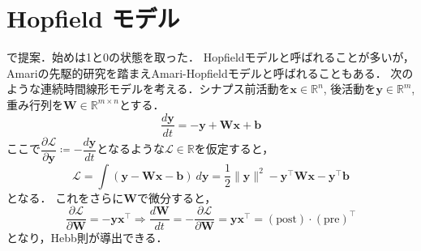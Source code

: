 \section{Hopfield モデル}
\citep{Hopfield1982-vu}で提案．始めは1と0の状態を取った．
Hopfieldモデルと呼ばれることが多いが，Amariの先駆的研究\citep{Amari1972-fq}を踏まえAmari-Hopfieldモデルと呼ばれることもある．
次のような連続時間線形モデルを考える．シナプス前活動を$\mathbf{x}\in \mathbb{R}^n$, 後活動を$\mathbf{y}\in \mathbb{R}^m$, 重み行列を$\mathbf{W}\in \mathbb{R}^{m\times n}$とする．
\begin{equation}
\frac{d\mathbf{y}}{dt}=-\mathbf{y}+\mathbf{W}\mathbf{x}+\mathbf{b}
\end{equation}
ここで$\dfrac{\partial\mathcal{L}}{\partial\mathbf{y}}\coloneqq-\dfrac{d\mathbf{y}}{dt}$となるような$\mathcal{L}\in \mathbb{R}$を仮定すると，
\begin{equation}
\mathcal{L}=\int \left(\mathbf{y}-\mathbf{W}\mathbf{x}-\mathbf{b}\right)\ d\mathbf{y}=\frac{1}{2}\|\mathbf{y}\|^2-\mathbf{y}^\top \mathbf{W}\mathbf{x}-\mathbf{y}^\top \mathbf{b}
\end{equation}
となる． これをさらに$\mathbf{W}$で微分すると，
\begin{equation}
\dfrac{\partial\mathcal{L}}{\partial\mathbf{W}}=-\mathbf{y}\mathbf{x}^\top\Rightarrow
\frac{d\mathbf{W}}{dt}=-\dfrac{\partial\mathcal{L}}{\partial\mathbf{W}}=\mathbf{y}\mathbf{x}^\top=(\text{post})\cdot (\text{pre})^\top
\end{equation}
となり，Hebb則が導出できる．
